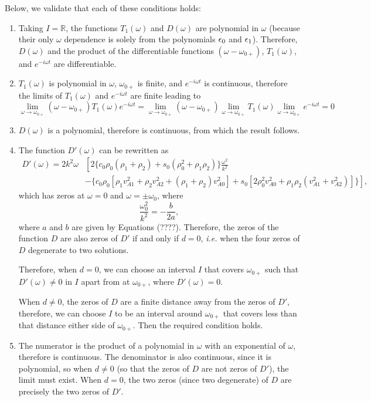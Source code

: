 \documentclass{aastex61}
\begin{document}
Below, we validate that each of these conditions holds:
\begin{enumerate}
	\item Taking $I = \mathbb{R}$, the functions $T_1(\omega)$ and $D(\omega)$ are polynomial in $\omega$ (because their only $\omega$ dependence is solely from the polynomials $\epsilon_0$ and $\epsilon_1$). Therefore, $D(\omega)$ and the product of the differentiable functions $(\omega - \omega_{0+})$, $T_1(\omega)$, and $e^{-i\omega t}$ are differentiable.
	
	\item $T_1(\omega)$ is polynomial in $\omega$, $\omega_{0+}$ is finite, and $e^{-i\omega t}$ is continuous, therefore the limits of $T_1(\omega)$ and $e^{-i\omega t}$ are finite leading to
		\begin{equation}
			\lim_{\omega \to \omega_{0+}}(\omega - \omega_{0+}) T_1(\omega) e^{-i\omega t} = \lim_{\omega \to \omega_{0+}}(\omega - \omega_{0+}) \lim_{\omega \to \omega_{0+}} T_1(\omega) \lim_{\omega \to \omega_{0+}} e^{-i\omega t} = 0
		\end{equation}
		
	\item $D(\omega)$ is a polynomial, therefore is continuous, from which the result follows.
	
	\item The function $D'(\omega)$ can be rewritten as
	\begin{align}
	D'(\omega) = 2k^2\omega&\left[ 2\{c_0\rho_0(\rho_1 + \rho_2) + s_0(\rho_0^2 + \rho_1\rho_2)\}\frac{\omega^2}{k^2} \right. \\
	&- \left. \{c_0\rho_0[\rho_1v_{A1}^2 + \rho_2v_{A2}^2 + (\rho_1 + \rho_2)v_{A0}^2] + s_0[2\rho_0^2v_{A0}^2 + \rho_1\rho_2(v_{A1}^2 + v_{A2}^2)]\}\right],
	\end{align}
	which has zeros at $\omega = 0$ and $\omega = \pm \omega_0$, where
	\begin{equation}
	\frac{\omega_0^2}{k^2} = -\frac{b}{2a},
	\end{equation}
	where $a$ and $b$ are given by Equations (????). Therefore, the zeros of the function $D$ are also zeros of $D'$ if and only if $d = 0$, \textit{i.e.} when the four zeros of $D$ degenerate to two solutions.
	
	Therefore, when $d = 0$, we can choose an interval $I$ that covers $\omega_{0+}$ such that $D'(\omega) \neq 0$ in $I$ apart from at $\omega_{0+}$, where $D'(\omega) = 0$.
	
	When $d \neq 0$, the zeros of $D$ are a finite distance away from the zeros of $D'$, therefore, we can choose $I$ to be an interval around $\omega_{0+}$ that covers less than that distance either side of $\omega_{0+}$. Then the required condition holds.
	
	\item The numerator is the product of a polynomial in $\omega$ with an exponential of $\omega$, therefore is continuous. The denominator is also continuous, since it is polynomial, so when $d \neq 0$ (so that the zeros of $D$ are not zeros of $D'$), the limit must exist. When $d = 0$, the two zeros (since two degenerate) of $D$ are precisely the two zeros of $D'$.
\end{enumerate}





\end{document}
